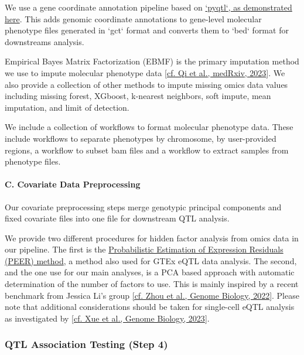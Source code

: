 \documentclass[12pt]{article}
\begin{document}
We use a gene coordinate annotation pipeline based on \href{https://github.com/broadinstitute/gtex-pipeline/blob/master/qtl/src/eqtl\\_prepare\\_expression.py}{`pyqtl`, as demonstrated here}. This adds genomic coordinate annotations to gene-level molecular phenotype files generated in `gct` format and converts them to `bed` format for downstreams analysis.


Empirical Bayes Matrix Factorization (EBMF) is the primary imputation method we use to impute molecular phenotype data \href{https://doi.org/10.1101/2023.11.29.23299181}{[cf. Qi et al., medRxiv,  2023}]. We also provide a collection of other methods to impute missing omics data values including missing forest, XGboost, k-nearest neighbors, soft impute, mean imputation, and limit of detection.

We include a collection of workflows to format molecular phenotype data. These include workflows to separate phenotypes by chromosome, by user-provided regions, a workflow to subset bam files and a workflow to extract samples from phenotype files.


\paragraph*{C.  Covariate Data Preprocessing}


Our covariate preprocessing steps merge genotypic principal components and fixed covariate files into one file for downstream QTL analysis.

We provide two different procedures for hidden factor analysis from omics data in our pipeline. The first is the \href{https://github.com/PMBio/peer/wiki/Tutorial}{Probabilistic Estimation of Expression Residuals (PEER) method}, a method also used for GTEx eQTL data analysis. The second, and the one use for our main analyses, is a PCA based approach with automatic determination of the number of factors to use. This is mainly inspired by a recent benchmark from Jessica Li's group \href{https://doi.org/10.1186/s13059-022-02761-4}{[cf. Zhou et al., Genome Biology, 2022}]. Please note that additional considerations should be taken for single-cell eQTL analysis as investigated by \href{https://doi.org/10.1186/s13059-023-02873-5}{[cf. Xue et al., Genome Biology, 2023}].

\subsubsection*{QTL Association Testing (Step 4)}
\end{document}
